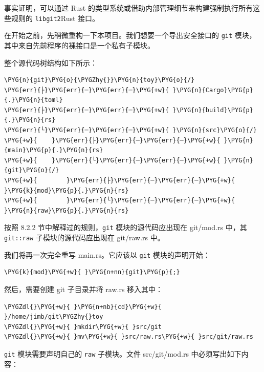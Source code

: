 事实证明，可以通过 Rust 的类型系统或借助内部管理细节来构建强制执行所有这些规则的 \texttt{libgit2}Rust 接口。

在开始之前，先稍微重构一下本项目。我们想要一个导出安全接口的 \texttt{git} 模块，其中来自先前程序的裸接口是一个私有子模块。

整个源代码树结构如下所示：

\begin{Verbatim}[commandchars=\\\{\},breaklines=true,breakanywhere=true,fontsize=\codefont,xleftmargin=17bp]
\PYG{n}{git}\PYG{o}{\PYGZhy{}}\PYG{n}{toy}\PYG{o}{/}
\PYG{err}{├}\PYG{err}{─}\PYG{err}{─}\PYG{+w}{ }\PYG{n}{Cargo}\PYG{p}{.}\PYG{n}{toml}
\PYG{err}{├}\PYG{err}{─}\PYG{err}{─}\PYG{+w}{ }\PYG{n}{build}\PYG{p}{.}\PYG{n}{rs}
\PYG{err}{└}\PYG{err}{─}\PYG{err}{─}\PYG{+w}{ }\PYG{n}{src}\PYG{o}{/}
\PYG{+w}{    }\PYG{err}{├}\PYG{err}{─}\PYG{err}{─}\PYG{+w}{ }\PYG{n}{main}\PYG{p}{.}\PYG{n}{rs}
\PYG{+w}{    }\PYG{err}{└}\PYG{err}{─}\PYG{err}{─}\PYG{+w}{ }\PYG{n}{git}\PYG{o}{/}
\PYG{+w}{        }\PYG{err}{├}\PYG{err}{─}\PYG{err}{─}\PYG{+w}{ }\PYG{k}{mod}\PYG{p}{.}\PYG{n}{rs}
\PYG{+w}{        }\PYG{err}{└}\PYG{err}{─}\PYG{err}{─}\PYG{+w}{ }\PYG{n}{raw}\PYG{p}{.}\PYG{n}{rs}
\end{Verbatim}

按照 8.2.2 节中解释过的规则，\texttt{git} 模块的源代码应出现在 git/mod.rs 中，其 \texttt{git::raw} 子模块的源代码应出现在 git/raw.rs 中。

我们将再一次完全重写 main.rs。它应该以 \texttt{git} 模块的声明开始：

\begin{Verbatim}[commandchars=\\\{\},breaklines=true,breakanywhere=true,fontsize=\codefont,xleftmargin=17bp]
\PYG{k}{mod}\PYG{+w}{ }\PYG{n+nn}{git}\PYG{p}{;}
\end{Verbatim}

然后，需要创建 git 子目录并将 raw.rs 移入其中：

\begin{Verbatim}[commandchars=\\\{\},breaklines=true,breakanywhere=true,fontsize=\codefont,xleftmargin=17bp]
\PYGZdl{}\PYG{+w}{ }\PYG{n+nb}{cd}\PYG{+w}{ }/home/jimb/git\PYGZhy{}toy
\PYGZdl{}\PYG{+w}{ }mkdir\PYG{+w}{ }src/git
\PYGZdl{}\PYG{+w}{ }mv\PYG{+w}{ }src/raw.rs\PYG{+w}{ }src/git/raw.rs
\end{Verbatim}

\texttt{git} 模块需要声明自己的 \texttt{raw} 子模块。文件 src/git/mod.rs 中必须写出如下内容：

